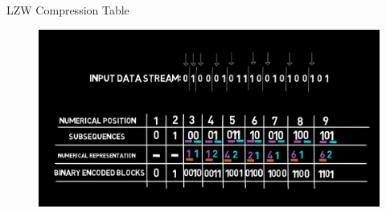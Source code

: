 \documentclass{beamer}
\begin{document}
\begin{frame}[fragile]{LZW Compression Table}
\begin{figure}
\centering
\includegraphics[width=\textwidth]{assets/10.png}
\end{figure}
\end{frame}
\end{document}
